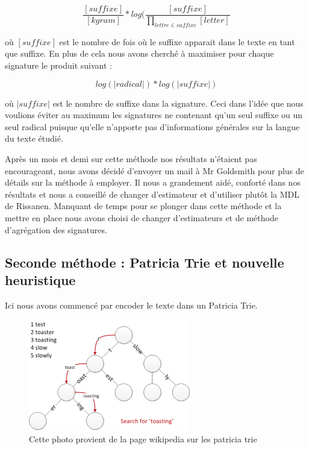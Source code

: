 \documentclass[11pt, oneside]{article}   	%
\begin{document}
\begin{equation}
\frac{[suffixe]}{[kgram]}*log(\frac{[suffixe]}{\prod_{lettre\in suffixe}^{}[letter]}
\end{equation}

où $[suffixe]$ est le nombre de fois où le suffixe apparait dans le texte en tant que suffixe. En plus de cela nous avons cherché à maximiser pour chaque signature le produit suivant : 

\begin{equation}
log(|radical|)*log(|suffixe|)
\end{equation}

où $|suffixe|$ est le nombre de suffixe dans la signature. Ceci dans l'idée que nous voulions éviter au maximum les signatures ne contenant qu'un seul suffixe ou un seul radical puisque qu'elle n'apporte pas d'informations générales sur la langue du texte étudié.

Après un mois et demi sur cette méthode nos résultats n'étaient pas encourageant, nous avons décidé d'envoyer un mail à Mr Goldsmith pour plus de détails sur la méthode à employer. Il nous a grandement aidé, conforté dans nos résultats et nous a conseillé de changer d'estimateur et d'utiliser plutôt la MDL de Rissanen. Manquant de temps pour se plonger dans cette méthode et la mettre en place nous avons choisi de changer d'estimateurs et de méthode d'agrégation des signatures. 

\subsection{Seconde méthode : Patricia Trie et nouvelle heuristique}

Ici nous avons commencé par encoder le texte dans un Patricia Trie. 

\begin{figure}[!h]
\centering
\includegraphics[width = 200pt]{patricia_trie.png}
\caption{Cette photo provient de la page wikipedia sur les patricia trie}
\end{figure}
\end{document}
